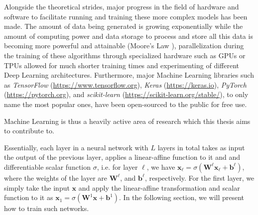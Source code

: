 \documentclass[a4paper, 11pt, oneside]{scrartcl}
\theoremstyle{break}
\newcommand{\matr}[1]{\boldsymbol{#1}}
\numberwithin{equation}{section}
\begin{document}
			Alongside the theoretical strides, major progress in the field of hardware and software to facilitate running and training these more complex models has been made.
			The amount of data being generated is growing exponentially \cite{ZPG13} while the amount of computing power and data storage to process and store all this data is becoming more powerful and attainable (Moore's Law \cite{S97}), parallelization during the training of these algorithms through specialized hardware such as GPUs or TPUs allowed for much shorter training times \cite{H18} and experimenting of different Deep Learning architectures. 
			Furthermore, major Machine Learning libraries such as \emph{TensorFlow} (\url{https://www.tensorflow.org}), \emph{Keras} (\url{https://keras.io}), \emph{PyTorch} (\url{https://pytorch.org}), and \emph{scikit-learn} (\url{https://scikit-learn.org/stable/}), to only name the most popular ones, have been open-sourced to the public for free use. 

			Machine Learning is thus a heavily active area of research which this thesis aims to contribute to. 

			Essentially, each layer in a neural network with $L$ layers in total takes as input the output of the previous layer, applies a linear-affine function to it and and differentiable scalar function $\sigma$, i.e. for layer $\ell$, we have $\matr{x}_{\ell} = \sigma(\matr{W}^{\ell} \matr{x}_{\ell} + \matr{b}^{\ell})$, where the weights of the layer are $\matr{W}^{\ell}$, and $\matr{b}^{\ell}$, respectively. 
			For the first layer, we simply take the input $\matr{x}$ and apply the linear-affine transformation and scalar function to it as $\matr{x}_{1} = \sigma(\matr{W}^{1} \matr{x} + \matr{b}^{1})$. 
			In the following section, we will present how to train such networks. 
\end{document}
